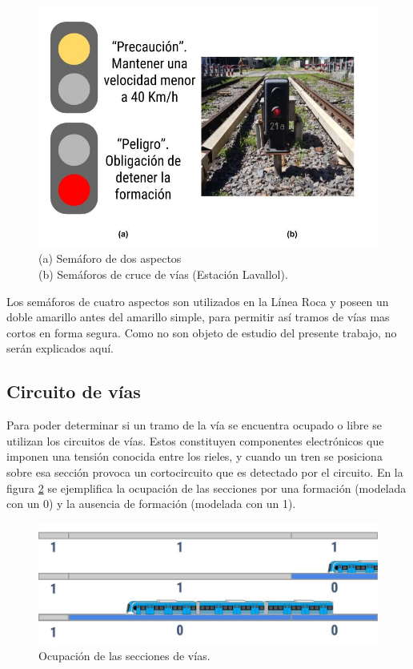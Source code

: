 			 \begin{figure}[htbp!]
				\centering
				\includegraphics[scale=.33]{./Figures/Sem2}
				\caption{(a) Semáforo de dos aspectos\\(b) Semáforos de cruce de vías (Estación Lavallol).}
				\label{fig:Sem_2Aspectos}
			\end{figure}				
			
			Los semáforos de cuatro aspectos son utilizados en la Línea Roca y poseen un doble amarillo antes del amarillo simple, para permitir así tramos de vías mas cortos en forma segura. Como no son objeto de estudio del presente trabajo, no serán explicados aquí.
		
		\subsection{Circuito de vías}
		
			Para poder determinar si un tramo de la vía se encuentra ocupado o libre se utilizan los circuitos de vías. Estos constituyen componentes electrónicos que imponen una tensión conocida entre los rieles, y cuando un tren se posiciona sobre esa sección provoca un cortocircuito que es detectado por el circuito. En la figura \ref{fig:Ocupacion} se ejemplifica la ocupación de las secciones por una formación (modelada con un 0) y la ausencia de formación (modelada con un 1).
			
			\begin{figure}[h]
				\centering
				\includegraphics[scale=.4]{./Figures/Ocupacion}
				\caption{Ocupación de las secciones de vías.}
				\label{fig:Ocupacion}
			\end{figure}
			
